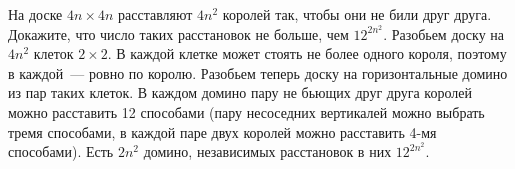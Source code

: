 \problem
На доске $4 n \times 4 n$ расставляют $4 n^2$ королей так, чтобы они не били
друг друга.
Докажите, что число таких расстановок не больше, чем $12^{2n^2}$.
\solution
Разобьем доску на $4 n^2$ клеток $2 \times 2$.
В каждой клетке может стоять не более одного короля, поэтому в каждой~--- ровно
по королю.
Разобьем теперь доску на горизонтальные домино из пар таких клеток.
В каждом домино пару не бьющих друг друга королей можно расставить 12 способами
(пару несоседних вертикалей можно выбрать тремя способами, в каждой паре двух
королей можно расставить 4-мя способами).
Есть $2 n^2$ домино, независимых расстановок в них $12^{2n^2}$.
\endproblem
